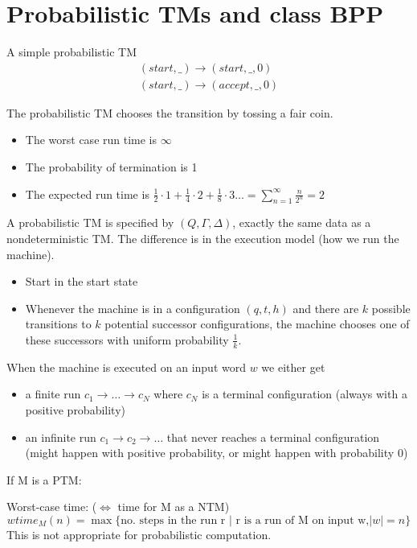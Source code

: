 \documentclass[a4paper,12pt]{article}
\theoremstyle{definition}
\theoremstyle{remark}
\begin{document}
\newpage
\section{Probabilistic TMs and class BPP}

A simple probabilistic TM 
\begin{gather*}
    (start, \_) \to (start, \_, 0)  \\
    (start, \_) \to (accept, \_, 0)
\end{gather*}

The probabilistic TM chooses the transition by tossing a fair coin.

\begin{itemize}
    \item The worst case run time is $\infty$
    \item The probability of termination is 1
    \item The expected run time is $\frac{1}{2} \cdot 1 + \frac{1}{4} \cdot 2 + \frac{1}{8} \cdot 3 \dots = \sum_{n = 1}^{\infty} \frac{n}{2^n} = 2$
\end{itemize}

A probabilistic TM is specified by $(Q, \Gamma, \Delta)$, exactly the same data as a nondeterministic TM. The difference is in the execution model
(how we run the machine).
\begin{itemize}
    \item Start in the start state
    \item Whenever the machine is in a configuration $(q, t, h)$ and there are $k$ possible transitions to $k$ potential successor configurations, the machine chooses
    one of these successors with uniform probability $\frac{1}{k}$.
\end{itemize}

When the machine is executed on an input word $w$ we either get
\begin{itemize}
    \item a finite run $c_1 \to \dots \to c_N$ where $c_N$ is a terminal configuration (always with a positive probability)
    \item an infinite run $c_1 \to c_2 \to \dots$ that never reaches a terminal configuration (might happen with positive probability, or might happen with probability $0$)
\end{itemize}

If M is a PTM:

Worst-case time: ($\iff$ time for M as a NTM)
\begin{equation*}
    wtime_M(n) = \max \{\text{no. steps in the run r | r is a run of M on input w,} |w| = n\}
\end{equation*}
This is not appropriate for probabilistic computation.
\end{document}
